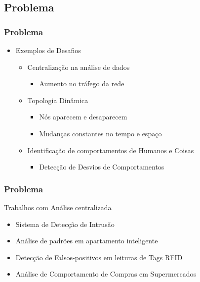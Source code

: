 \documentclass[hyperref={pdfpagelabels=false}]{beamer}
\begin{document}
\subsection{Problema}
 
\begin{frame}

	\frametitle{Problema}	

	\begin{itemize}
    	\item Exemplos de Desafios \cite{000-000} \begin{itemize} 
        	\item Centralização na análise de dados  \begin{itemize}
      	    	\item Aumento no tráfego da rede
			\end{itemize}
       		\item Topologia Dinâmica \begin{itemize}
          		\item Nós aparecem e desaparecem
               	\item Mudanças constantes no tempo e espaço
			\end{itemize}
        	\item Identificação de comportamentos de Humanos e Coisas \begin{itemize}
        		\item Detecção de Desvios de Comportamentos
        	\end{itemize}
        	\end{itemize}
	\end{itemize}
    
\end{frame}
 
\begin{frame}
	\frametitle{Problema}
    
    Trabalhos com Análise centralizada
    \linebreak
    \begin{itemize}
	    \item Sistema de Detecção de Intrusão \cite{004-000}
        \item Análise de padrões em apartamento inteligente \cite{009-038}
        \item Detecção de Falsos-positivos em leituras de Tags RFID \cite{000-015}
        \item Análise de Comportamento de Compras em Supermercados \cite{000-123}
        
    \end{itemize}
\end{frame} 
 
\end{document}
